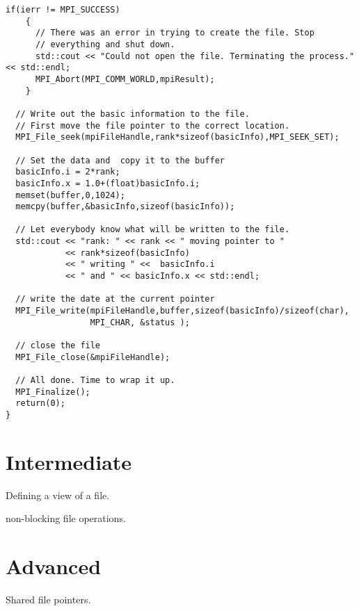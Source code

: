 \begin{lstlisting}[caption={Example of writing information to a file.},
                   basicstyle=\scriptsize,
                   label=listing:writeFile]
  if(ierr != MPI_SUCCESS)
    {
      // There was an error in trying to create the file. Stop
      // everything and shut down.
      std::cout << "Could not open the file. Terminating the process." << std::endl;
      MPI_Abort(MPI_COMM_WORLD,mpiResult);
    }

  // Write out the basic information to the file.
  // First move the file pointer to the correct location.
  MPI_File_seek(mpiFileHandle,rank*sizeof(basicInfo),MPI_SEEK_SET);

  // Set the data and  copy it to the buffer
  basicInfo.i = 2*rank;
  basicInfo.x = 1.0+(float)basicInfo.i;
  memset(buffer,0,1024);
  memcpy(buffer,&basicInfo,sizeof(basicInfo));

  // Let everybody know what will be written to the file.
  std::cout << "rank: " << rank << " moving pointer to "
            << rank*sizeof(basicInfo) 
            << " writing " <<  basicInfo.i 
            << " and " << basicInfo.x << std::endl;

  // write the date at the current pointer
  MPI_File_write(mpiFileHandle,buffer,sizeof(basicInfo)/sizeof(char),
                 MPI_CHAR, &status );

  // close the file 
  MPI_File_close(&mpiFileHandle);

  // All done. Time to wrap it up.
  MPI_Finalize();
  return(0);
}
\end{lstlisting}

\section{Intermediate}

Defining a view of a file. 

non-blocking file operations.

\section{Advanced}

Shared file pointers.

